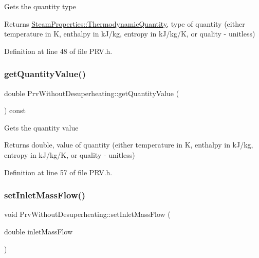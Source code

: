Gets the quantity type

\begin{DoxyReturn}{Returns}
\hyperlink{class_steam_properties_ae0294bedf7d178c2d8fb6aed0f62fbff}{Steam\+Properties\+::\+Thermodynamic\+Quantity}, type of quantity (either temperature in K, enthalpy in k\+J/kg, entropy in k\+J/kg/K, or quality -\/ unitless) 
\end{DoxyReturn}


Definition at line 48 of file P\+R\+V.\+h.

\mbox{\label{class_prv_without_desuperheating_a1113c254f45d08588b0afe4bd1273530}} 
\subsubsection{\texorpdfstring{get\+Quantity\+Value()}{getQuantityValue()}}
{\footnotesize\ttfamily double Prv\+Without\+Desuperheating\+::get\+Quantity\+Value (\begin{DoxyParamCaption}{ }\end{DoxyParamCaption}) const\hspace{0.3cm}{\ttfamily [inline]}}

Gets the quantity value

\begin{DoxyReturn}{Returns}
double, value of quantity (either temperature in K, enthalpy in k\+J/kg, entropy in k\+J/kg/K, or quality -\/ unitless) 
\end{DoxyReturn}


Definition at line 57 of file P\+R\+V.\+h.

\mbox{\label{class_prv_without_desuperheating_abeccff2dc91144452b34ca343ee63fa7}} 
\subsubsection{\texorpdfstring{set\+Inlet\+Mass\+Flow()}{setInletMassFlow()}}
{\footnotesize\ttfamily void Prv\+Without\+Desuperheating\+::set\+Inlet\+Mass\+Flow (\begin{DoxyParamCaption}\item[{double}]{inlet\+Mass\+Flow }\end{DoxyParamCaption})\hspace{0.3cm}{\ttfamily [inline]}}

